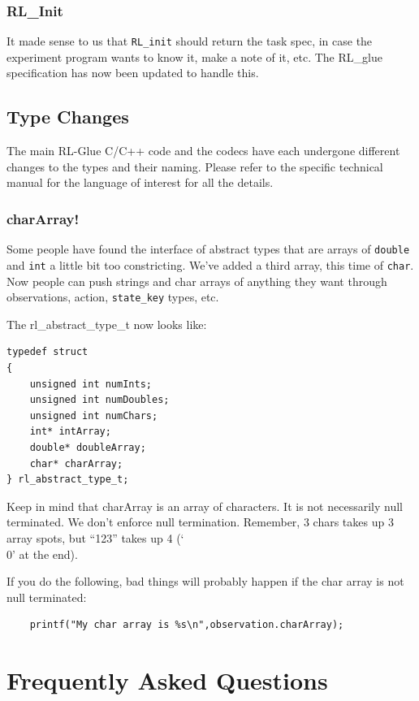 \documentclass[11pt]{article}
\begin{document}
\subsubsection{RL\_Init}
It made sense to us that \texttt{RL\_init} should return the task spec, in case the experiment program wants to know it, make a note of it, etc. The RL\_glue specification has now been updated to handle this.

\subsection{Type Changes}
The main RL-Glue C/C++ code and the codecs have each undergone different changes to the types and their naming.
Please refer to the specific technical manual for the language of interest for all the details.

\subsubsection{charArray!}
Some people have found the interface of abstract types that are arrays of \texttt{double} and \texttt{int} a little bit too constricting.  We've added a third array, this time of \texttt{char}.  Now people can push strings and char arrays of anything they want through observations, action, \texttt{state\_key} types, etc.

The rl\_abstract\_type\_t now looks like:
\begin{verbatim}
typedef struct
{
    unsigned int numInts;
    unsigned int numDoubles;
    unsigned int numChars;
    int* intArray;
    double* doubleArray;
    char* charArray;
} rl_abstract_type_t;
\end{verbatim}

Keep in mind that charArray is an array of characters.  It is not necessarily null terminated.  We don't enforce null termination. Remember, 3 chars takes up 3 array spots, but ``123'' takes up 4 (`\\0' at the end).

If you do the following, bad things will probably happen if the char array is not null terminated:
\begin{verbatim}
	printf("My char array is %s\n",observation.charArray);
\end{verbatim}

\section{Frequently Asked Questions}
\label{faq}
\end{document}
